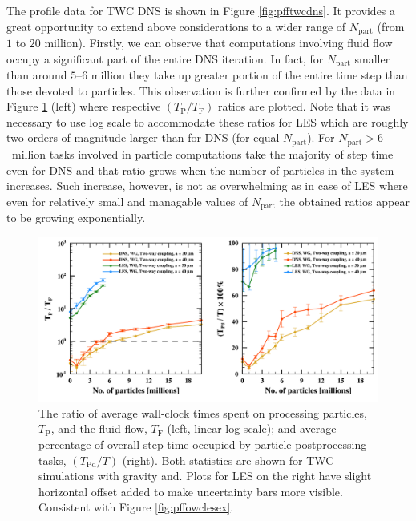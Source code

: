 \documentclass{pracamgren}
\begin{document}
The profile data for TWC DNS is shown in Figure \ref{fig:pfftwcdns}.
It provides a great opportunity to extend above considerations to a wider range of $N_{\text{part}}$ (from $1$ to $20$ million).
Firstly, we can observe that computations involving fluid flow occupy a significant part of the entire DNS iteration.
In fact, for $N_{\text{part}}$ smaller than around $5$--$6$ million they take up greater portion of the entire time step than those devoted to particles.
This observation is further confirmed by the data in Figure \ref{fig:pfftwcex} (left) where respective $(T_{\text{P}} / T_{\text{F}})$ ratios are plotted.
Note that it was necessary to use log scale to accommodate these ratios for LES which are roughly two orders of magnitude larger than for DNS (for equal $N_{\text{part}}$).
For ${N_{\text{part}} > 6}$~million tasks involved in particle computations take the majority of step time even for DNS and that ratio grows when the number of particles in the system increases.
Such increase, however, is not as overwhelming as in case of LES where even for relatively small and managable values of $N_{\text{part}}$ the obtained ratios appear to be growing exponentially.

\begin{figure}[h]
\centering
\includegraphics[width=13.5cm]{figures/3-10_pfftwcex.pdf}
\caption{
The ratio of average wall-clock times spent on processing particles, $T_{\text{P}}$, and the fluid flow, $T_{\text{F}}$ (left, linear-log scale); and average percentage of overall step time occupied by particle postprocessing tasks, $(T_{\text{Pd}} / T)$ (right).
Both statistics are shown for TWC simulations with gravity and.
Plots for LES on the right have slight horizontal offset added to make uncertainty bars more visible.
Consistent with Figure \ref{fig:pffowclesex}.
}
\label{fig:pfftwcex}
\end{figure}
\end{document}
